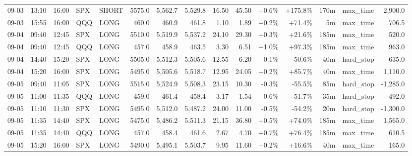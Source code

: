\documentclass[11pt,a4paper,twoside]{article}
\begin{document}
\begin{landscape}
\begin{center}
\begin{longtable}{>{\color{txtmain}}l l l l l r r r r r r r r >{\color{txtmain}}l r}
09-03 & 13:10 & 16:00 & SPX & SHORT & 5575.0 & 5,562.7 & 5,529.8 & 16.50 & 45.50 & \textcolor{wingreen}{+0.6\%} & \textcolor{wingreen}{+175.8\%} & 170m & max\_time & \textcolor{wingreen}{2,900.0} \\
09-03 & 15:55 & 16:00 & QQQ & LONG & 460.0 & 460.9 & 461.8 & 1.10 & 1.89 & \textcolor{wingreen}{+0.2\%} & \textcolor{wingreen}{+71.4\%} & 5m & max\_time & \textcolor{wingreen}{706.5} \\
09-04 & 09:40 & 12:45 & SPX & LONG & 5510.0 & 5,519.9 & 5,537.2 & 24.10 & 29.30 & \textcolor{wingreen}{+0.3\%} & \textcolor{wingreen}{+21.6\%} & 185m & max\_time & \textcolor{wingreen}{520.0} \\
09-04 & 09:40 & 12:45 & QQQ & LONG & 457.0 & 458.9 & 463.5 & 3.30 & 6.51 & \textcolor{wingreen}{+1.0\%} & \textcolor{wingreen}{+97.3\%} & 185m & max\_time & \textcolor{wingreen}{963.0} \\
09-04 & 14:40 & 15:20 & SPX & LONG & 5505.0 & 5,512.3 & 5,505.6 & 12.55 & 6.20 & \textcolor{lossred}{-0.1\%} & \textcolor{lossred}{-50.6\%} & 40m & hard\_stop & \textcolor{lossred}{-635.0} \\
09-04 & 15:20 & 16:00 & SPX & LONG & 5495.0 & 5,505.6 & 5,518.7 & 12.95 & 24.05 & \textcolor{wingreen}{+0.2\%} & \textcolor{wingreen}{+85.7\%} & 40m & max\_time & \textcolor{wingreen}{1,110.0} \\
09-05 & 09:40 & 11:05 & SPX & LONG & 5515.0 & 5,524.9 & 5,508.3 & 23.15 & 10.30 & \textcolor{lossred}{-0.3\%} & \textcolor{lossred}{-55.5\%} & 85m & hard\_stop & \textcolor{lossred}{-1,285.0} \\
09-05 & 11:00 & 11:35 & QQQ & LONG & 459.0 & 461.4 & 458.4 & 3.17 & 1.54 & \textcolor{lossred}{-0.6\%} & \textcolor{lossred}{-51.7\%} & 35m & hard\_stop & \textcolor{lossred}{-492.0} \\
09-05 & 11:10 & 11:30 & SPX & LONG & 5495.0 & 5,512.0 & 5,487.2 & 24.00 & 11.00 & \textcolor{lossred}{-0.5\%} & \textcolor{lossred}{-54.2\%} & 20m & hard\_stop & \textcolor{lossred}{-1,300.0} \\
09-05 & 11:35 & 14:40 & SPX & LONG & 5475.0 & 5,486.2 & 5,511.3 & 21.15 & 36.80 & \textcolor{wingreen}{+0.5\%} & \textcolor{wingreen}{+74.0\%} & 185m & max\_time & \textcolor{wingreen}{1,565.0} \\
09-05 & 11:35 & 14:40 & QQQ & LONG & 457.0 & 458.4 & 461.6 & 2.67 & 4.70 & \textcolor{wingreen}{+0.7\%} & \textcolor{wingreen}{+76.4\%} & 185m & max\_time & \textcolor{wingreen}{610.5} \\
09-05 & 15:20 & 16:00 & SPX & LONG & 5490.0 & 5,495.1 & 5,503.7 & 9.95 & 11.60 & \textcolor{wingreen}{+0.2\%} & \textcolor{wingreen}{+16.6\%} & 40m & max\_time & \textcolor{wingreen}{165.0} \\

\end{longtable}
\end{center}
\end{landscape}
\end{document}
